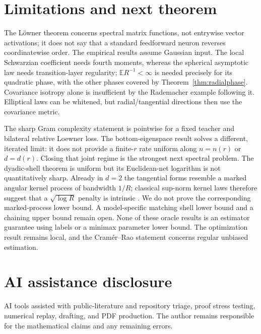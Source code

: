 \documentclass[11pt]{article}
\newcommand{\E}{\mathbb E}
\begin{document}
\section{Limitations and next theorem}

The L\"owner theorem concerns spectral matrix functions, not entrywise vector activations; it does not say that a
standard feedforward neuron reverses coordinatewise order.  The empirical results assume Gaussian input.  The
local Schwarzian coefficient needs fourth moments, whereas the spherical asymptotic law needs transition-layer
regularity; $\E R^{-1}<\infty$ is needed precisely for its quadratic phase, with the other phases covered by
Theorem~\ref{thm:radialphase}.  Covariance isotropy alone is insufficient by the Rademacher example following it.
Elliptical laws can be whitened, but radial/tangential directions then use the covariance metric.

The sharp Gram complexity statement is pointwise for a fixed teacher and bilateral relative Loewner loss.  The
bottom-eigenspace result solves a different, iterated limit: it does not provide a finite-$r$ rate uniform along
$n=n(r)$ or $d=d(r)$.  Closing that joint regime is the strongest next spectral problem.  The dyadic-shell theorem
is uniform but its Euclidean-net logarithm is not quantitatively sharp.  Already in $d=2$ the tangential forms
resemble a marked angular kernel process of bandwidth $1/R$; classical sup-norm kernel laws therefore suggest that
a $\sqrt{\log R}$ penalty is intrinsic \cite{bickel1973,gine2004}.  We do not prove the corresponding marked-process
lower bound.  A model-specific matching shell lower bound and a chaining upper bound remain open.
None of these oracle results is an estimator guarantee using labels or a minimax parameter lower bound.  The
optimization result remains local, and the Cram\'er--Rao statement concerns regular unbiased estimation.

\section*{AI assistance disclosure}
AI tools assisted with public-literature and repository triage, proof stress testing, numerical replay, drafting, and
PDF production.  The author remains responsible for the mathematical claims and any remaining errors.
\end{document}
